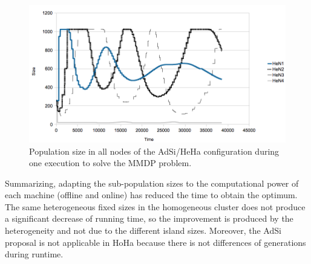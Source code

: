 \begin{figure}
\centering
 \includegraphics[scale =0.4] {gfx/adaptiveresults/sizesMMDP1ejec.png}
\caption{Population size in all nodes of the AdSi/HeHa configuration during one execution to solve
  the MMDP problem.} %
\label{fig:sizesMMDP1ejec}
\end{figure}



\begin{table}
\end{table}



Summarizing, adapting the sub-population sizes to the computational
power of each machine (offline and online) has reduced the time to
obtain the optimum. The same heterogeneous fixed sizes in the
homogeneous cluster does not produce a significant decrease of running
time, so the improvement is produced by the heterogeneity and not due
to the different island sizes. Moreover, the AdSi proposal is not
applicable in HoHa because there is not differences of generations
during runtime. %

